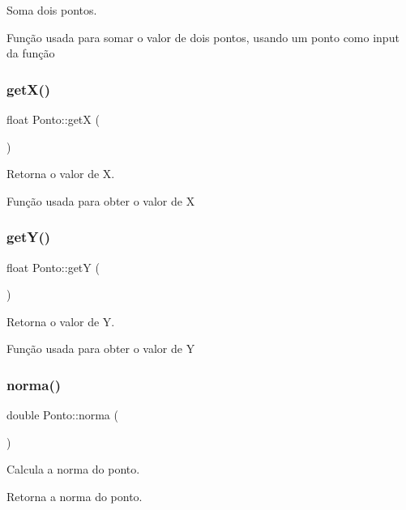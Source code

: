 Soma dois pontos. 

Função usada para somar o valor de dois pontos, usando um ponto como input da função \mbox{\label{class_ponto_ae4823d6ee26ff3448ee403d26a3c6d2f}} 
\subsubsection{\texorpdfstring{get\+X()}{getX()}}
{\footnotesize\ttfamily float Ponto\+::getX (\begin{DoxyParamCaption}{ }\end{DoxyParamCaption})}



Retorna o valor de X. 

Função usada para obter o valor de X \mbox{\label{class_ponto_ab120600953e6544301223b9b05a43ee5}} 
\subsubsection{\texorpdfstring{get\+Y()}{getY()}}
{\footnotesize\ttfamily float Ponto\+::getY (\begin{DoxyParamCaption}{ }\end{DoxyParamCaption})}



Retorna o valor de Y. 

Função usada para obter o valor de Y \mbox{\label{class_ponto_aabf21d159fc5b233d5e58d06cc4a6b6c}} 
\subsubsection{\texorpdfstring{norma()}{norma()}}
{\footnotesize\ttfamily double Ponto\+::norma (\begin{DoxyParamCaption}{ }\end{DoxyParamCaption})}



Calcula a norma do ponto. 

Retorna a norma do ponto. \mbox{\label{class_ponto_a3dcee3a98a8863d4067a8de537b2a433}} 
